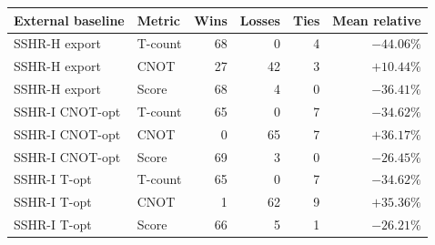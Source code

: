 \begin{tabular}{llrrrr}
\toprule
External baseline & Metric & Wins & Losses & Ties & Mean relative \\
\midrule
SSHR-H export & T-count & 68 & 0 & 4 & $-44.06\%$ \\
SSHR-H export & CNOT & 27 & 42 & 3 & $+10.44\%$ \\
SSHR-H export & Score & 68 & 4 & 0 & $-36.41\%$ \\
SSHR-I CNOT-opt & T-count & 65 & 0 & 7 & $-34.62\%$ \\
SSHR-I CNOT-opt & CNOT & 0 & 65 & 7 & $+36.17\%$ \\
SSHR-I CNOT-opt & Score & 69 & 3 & 0 & $-26.45\%$ \\
SSHR-I T-opt & T-count & 65 & 0 & 7 & $-34.62\%$ \\
SSHR-I T-opt & CNOT & 1 & 62 & 9 & $+35.36\%$ \\
SSHR-I T-opt & Score & 66 & 5 & 1 & $-26.21\%$ \\
\bottomrule
\end{tabular}
